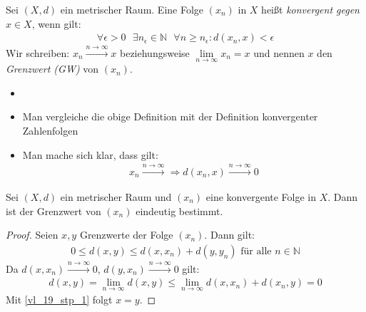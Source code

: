 \begin{Definition}{%
	Sei $(X,d)$ ein metrischer Raum. Eine Folge $(x_n)$ in $X$ heißt 
	\emph{konvergent gegen} $x \in X$, wenn gilt:
	\begin{align*}
		\forall \epsilon > 0 \text{ } \exists n_\epsilon \in \mathbb{N} \text{ }
		\forall n \geq n_\epsilon : d(x_n, x) < \epsilon
	\end{align*}
	Wir schreiben: $x_n \overset{n\rightarrow \infty}{\longrightarrow} x$ 
	beziehungsweise $\lim\limits_{n \rightarrow \infty}{x_n} = x$ und nennen 
	$x$ den \emph{Grenzwert (GW)} von $(x_n)$. 
}\end{Definition}

\begin{Bemerkung}{
	\begin{itemize}
		\item[ ]
		\item Man vergleiche die obige Definition mit der Definition konvergenter 
		 Zahlenfolgen
		 \item Man mache sich klar, dass gilt:
		 \begin{align*}
		 	x_n \overset{n \rightarrow \infty}{\longrightarrow} \Longrightarrow 
		 	d(x_n, x) \overset{n \rightarrow \infty}{\longrightarrow} 0
		 \end{align*} 
	\end{itemize}
}\end{Bemerkung}

\begin{Lemma}{%
	Sei $(X,d)$ ein metrischer Raum und $(x_n)$ eine konvergente Folge in $X$. 
	Dann ist der Grenzwert von $(x_n)$ eindeutig bestimmt.
}\end{Lemma}

\begin{proof}
	Seien $x,y$ Grenzwerte der Folge $(x_n)$. Dann gilt:
	\begin{align*}
		0 \leq d (x,y) \leq d(x,x_n) + d(y, y_n) \text{ für alle } n \in \mathbb{N}
	\end{align*}
	Da $d(x,x_n) \overset{n \rightarrow \infty}{\longrightarrow} 0$, 
	$d(y, x_n) \overset{n \rightarrow \infty}{\longrightarrow} 0$ gilt:
	\begin{align*}
		d(x,y) = \lim\limits_{n \rightarrow \infty} d(x,y) \leq 
		\lim\limits_{n \rightarrow \infty} d(x,x_n) + d(x_n,y) = 0
	\end{align*}
	Mit \ref{vl_19_stp_1} folgt $x = y$.
\end{proof}

